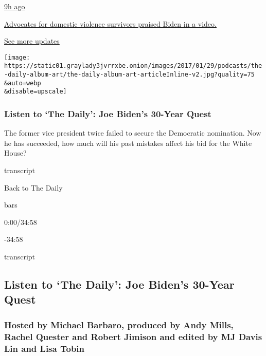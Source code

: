 \href{https://www.nytimes3xbfgragh.onion/live/2020/08/19/us/dnc-convention-election?action=click\&pgtype=Article\&state=default\&region=MAIN_CONTENT_1\&context=storylines_live_updates\#advocates-for-domestic-violence-survivors-praised-biden-in-a-video}{9h
ago}

\href{https://www.nytimes3xbfgragh.onion/live/2020/08/19/us/dnc-convention-election?action=click\&pgtype=Article\&state=default\&region=MAIN_CONTENT_1\&context=storylines_live_updates\#advocates-for-domestic-violence-survivors-praised-biden-in-a-video}{Advocates
for domestic violence survivors praised Biden in a video.}

\href{https://www.nytimes3xbfgragh.onion/live/2020/08/19/us/dnc-convention-election?action=click\&pgtype=Article\&state=default\&region=MAIN_CONTENT_1\&context=storylines_live_updates}{See
more updates}

\texttt{[image: https://static01.graylady3jvrrxbe.onion/images/2017/01/29/podcasts/the-daily-album-art/the-daily-album-art-articleInline-v2.jpg?quality=75\\\&auto=webp\\\&disable=upscale]}

\hypertarget{listen-to-the-daily-joe-bidens-30-year-quest}{%
\subsubsection{Listen to `The Daily': Joe Biden's 30-Year
Quest}\label{listen-to-the-daily-joe-bidens-30-year-quest}}

The former vice president twice failed to secure the Democratic
nomination. Now he has succeeded, how much will his past mistakes affect
his bid for the White House?

transcript

Back to The Daily

bars

0:00/34:58

-34:58

transcript

\hypertarget{listen-to-the-daily-joe-bidens-30-year-quest-1}{%
\subsection{Listen to `The Daily': Joe Biden's 30-Year
Quest}\label{listen-to-the-daily-joe-bidens-30-year-quest-1}}

\hypertarget{hosted-by-michael-barbaro-produced-by-andy-mills-rachel-quester-and-robert-jimison-and-edited-by-mj-davis-lin-and-lisa-tobin}{%
\subsubsection{Hosted by Michael Barbaro, produced by Andy Mills, Rachel
Quester and Robert Jimison and edited by MJ Davis Lin and Lisa
Tobin}\label{hosted-by-michael-barbaro-produced-by-andy-mills-rachel-quester-and-robert-jimison-and-edited-by-mj-davis-lin-and-lisa-tobin}}

